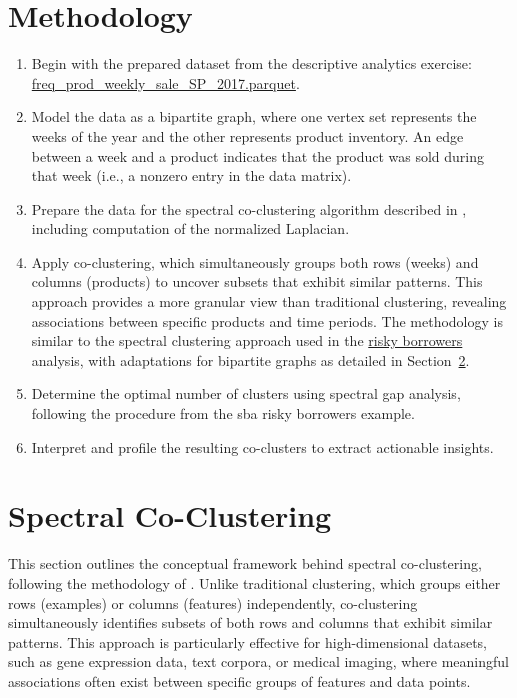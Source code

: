 \documentclass[12pt]{article}
\begin{document}
 \section{Methodology}
\begin{enumerate}
    \item Begin with the prepared dataset from the descriptive analytics exercise: \href{https://github.com/rajivsam/descriptive_analytics/blob/main/data/olist_prepared/freq_prod_weekly_sale_SP_2017.parquet}{freq\_prod\_weekly\_sale\_SP\_2017.parquet}.
    \item Model the data as a bipartite graph, where one vertex set represents the weeks of the year and the other represents product inventory. An edge between a week and a product indicates that the product was sold during that week (i.e., a nonzero entry in the data matrix).

    \item Prepare the data for the spectral co-clustering algorithm described in \cite{dhillon2001co}, including computation of the normalized Laplacian. 
    
    \item Apply co-clustering, which simultaneously groups both rows (weeks) and columns (products) to uncover subsets that exhibit similar patterns. This approach provides a more granular view than traditional clustering, revealing associations between specific products and time periods. The methodology is similar to the spectral clustering approach used in the \href{https://github.com/rajivsam/descriptive_analytics/blob/main/examples/sba_7a_loans_analysis/sba_7a_risky_borrower_analysis.pdf}{risky borrowers} analysis, with adaptations for bipartite graphs as detailed in Section~\ref{sec:coclustering}.
    
    \item Determine the optimal number of clusters using spectral gap analysis, following the procedure from the sba risky borrowers example.
    \item Interpret and profile the resulting co-clusters to extract actionable insights.
\end{enumerate}

\section{Spectral Co-Clustering}\label{sec:coclustering}
This section outlines the conceptual framework behind spectral co-clustering, following the methodology of \cite{dhillon2001co}. Unlike traditional clustering, which groups either rows (examples) or columns (features) independently, co-clustering simultaneously identifies subsets of both rows and columns that exhibit similar patterns. This approach is particularly effective for high-dimensional datasets, such as gene expression data, text corpora, or medical imaging, where meaningful associations often exist between specific groups of features and data points.
\end{document}

